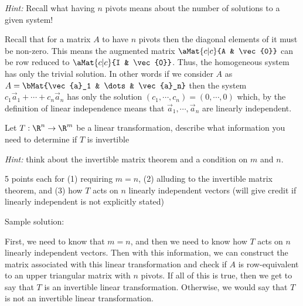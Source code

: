 \documentclass[12pt,addpoints,answers]{exam}
\begin{document}
\begin{questions}
\begin{parts}
        \emph{Hint:} Recall what having $n$ pivots means about the number of solutions to a given system!
        \begin{solution}
            Recall that for a matrix $A$ to have $n$ pivots then the diagonal elements of it
            must be non-zero. This means the augmented matrix $\aMat{c|c}{A & \vec{0}}$ can be row
            reduced to $\aMat{c|c}{I & \vec{0}}$. Thus, the homogeneous system has only the trivial
            solution. In other words if we consider $A$ as $A = \bMat{\vec{a}_1 & \dots & \vec{a}_n}$
            then the system $c_1\vec{a}_1 + \cdots + c_n\vec{a}_n$ has only the solution
            $(c_1,\cdots,c_n) = (0,\cdots,0)$ which, by the definition of linear independence means
            that $\vec{a}_1,\cdots,\vec{a}_n$ are linearly independent.
        \end{solution}
        \vfill
    \end{parts}
    \newpage
    \question[15] Let $T:\R^{n}\rightarrow\R^{m}$ be a linear transformation, describe what information
    you need to determine if $T$ is invertible

    \emph{Hint:} think about the invertible matrix theorem and a condition on $m$ and $n$.
    \begin{solution}
        5 points each for (1) requiring $m=n$, (2) alluding to the invertible matrix theorem, and
        (3) how $T$ acts on $n$ linearly independent vectors (will give credit if linearly independent is
        not explicitly stated)

        Sample solution:

        First, we need to know that $m=n$, and then we need to know how $T$ acts on $n$ linearly
        independent vectors. Then with this information, we can construct the matrix associated with
        this linear transformation and check if $A$ is row-equivalent to an upper triangular matrix
        with $n$ pivots. If all of this is true, then we get to say that $T$ is an invertible linear
        transformation. Otherwise, we would say that $T$ is not an invertible linear transformation.
    \end{solution}
    \newpage

\end{questions}
\end{document}
